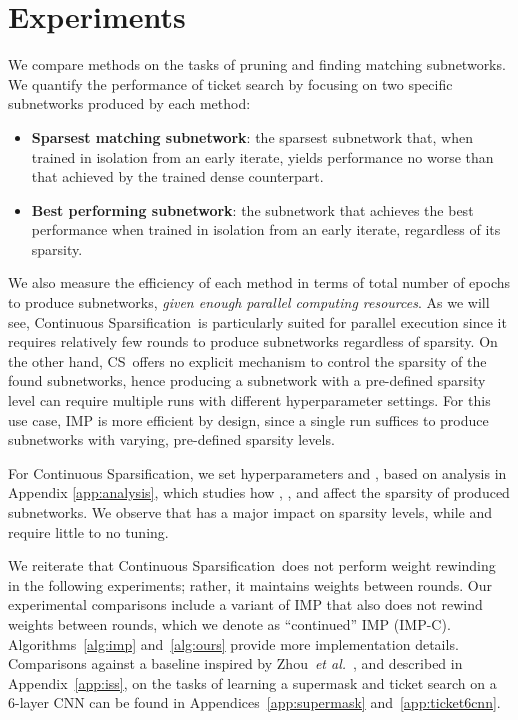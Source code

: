 \documentclass{article}
\newcommand{\etal}{\textit{et al.}}
\newcommand{\method}{Continuous Sparsification}
\newcommand{\methodacro}{CS}
\begin{document}
 \section{Experiments}

We compare methods on the tasks of pruning and finding matching subnetworks. We quantify the performance of ticket search by focusing on two specific subnetworks produced by each method:
\vspace{-7pt}
\begin{itemize}[leftmargin=*,itemsep=0pt]
    \item \textbf{Sparsest matching subnetwork}: the sparsest subnetwork that, when trained in isolation from an early iterate, yields performance no worse than that achieved by the trained dense counterpart.
    \item \textbf{Best performing subnetwork}: the subnetwork that achieves the best performance when trained in isolation from an early iterate, regardless of its sparsity.
\end{itemize}

We also measure the efficiency of each method in terms of total number of epochs to produce subnetworks, \emph{given enough parallel computing resources}. As we will see, \method~is particularly suited for parallel execution since it requires relatively few rounds to produce subnetworks regardless of sparsity. On the other hand, \methodacro~offers no explicit mechanism to control the sparsity of the found subnetworks, hence producing a subnetwork with a pre-defined sparsity level can require multiple runs with different hyperparameter settings. For this use case, IMP is more efficient by design, since a single run suffices to produce subnetworks with varying, pre-defined sparsity levels.

For \method, we set hyperparameters  and , based on analysis in Appendix \ref{app:analysis}, which studies how , , and  affect the sparsity of produced subnetworks. We observe that  has a major impact on sparsity levels, while  and  require little to no tuning.

We reiterate that \method~does not perform weight rewinding in the following experiments; rather, it maintains weights between rounds. Our experimental comparisons include a variant of IMP that also does not rewind weights between rounds, which we denote as ``continued'' IMP (IMP-C). Algorithms~\ref{alg:imp} and~\ref{alg:ours} provide more implementation details. Comparisons against a baseline inspired by Zhou~\etal~\cite{deconstructing}, and described in Appendix~\ref{app:iss}, on the tasks of learning a supermask and ticket search on a 6-layer CNN can be found in Appendices~\ref{app:supermask} and~\ref{app:ticket6cnn}.
\end{document}
